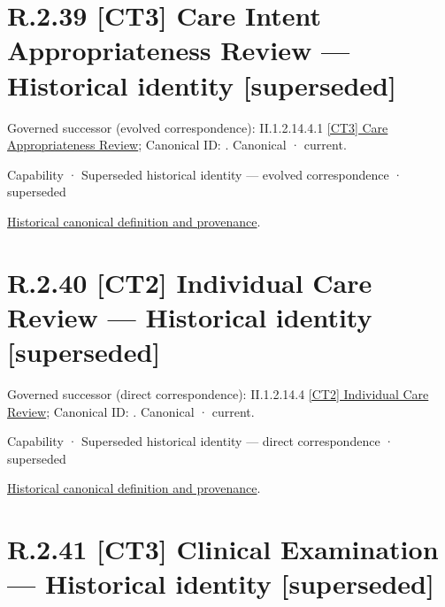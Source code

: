 \section*{R.2.39 [CT3] Care Intent Appropriateness Review — Historical identity [superseded]}
\label{navigation:R.2.39}

{\small Governed successor (evolved correspondence): II.1.2.14.4.1 \hyperref[element:5eac5fb73e31416288d8c992805b33cb]{[CT3] Care Appropriateness Review}; Canonical ID: \texttt{}. Canonical · current.}\par
\label{element:905eb2de1ac341ac96331e3d7f76079b}
{\small Capability · Superseded historical identity — evolved correspondence · superseded}\par
\href{../../../../continuum/strategy/capability/905eb2de1ac341ac96331e3d7f76079b.md}{Historical canonical definition and provenance}.\par
\section*{R.2.40 [CT2] Individual Care Review — Historical identity [superseded]}
\label{navigation:R.2.40}

{\small Governed successor (direct correspondence): II.1.2.14.4 \hyperref[element:625a93f132f242f5a8e2ae1dc19979fb]{[CT2] Individual Care Review}; Canonical ID: \texttt{}. Canonical · current.}\par
\label{element:e1048f6c635d4e16b5384cc2cb45a71b}
{\small Capability · Superseded historical identity — direct correspondence · superseded}\par
\href{../../../../continuum/strategy/capability/e1048f6c635d4e16b5384cc2cb45a71b.md}{Historical canonical definition and provenance}.\par
\section*{R.2.41 [CT3] Clinical Examination — Historical identity [superseded]}
\label{navigation:R.2.41}

